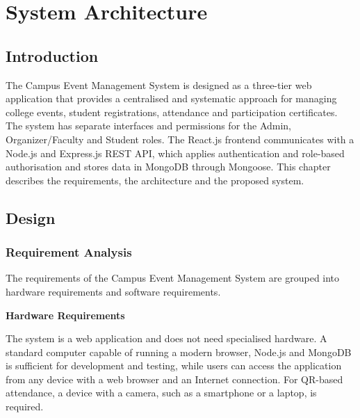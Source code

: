 \documentclass[12pt,a4paper]{report}
\begin{document}
\chapter{System Architecture}

\section{Introduction}
The Campus Event Management System is designed as a three-tier web application that provides a centralised and systematic approach for managing college events, student registrations, attendance and participation certificates. The system has separate interfaces and permissions for the Admin, Organizer/Faculty and Student roles. The React.js frontend communicates with a Node.js and Express.js REST API, which applies authentication and role-based authorisation and stores data in MongoDB through Mongoose. This chapter describes the requirements, the architecture and the proposed system.

\section{Design}

\subsection{Requirement Analysis}
The requirements of the Campus Event Management System are grouped into hardware requirements and software requirements.

\textbf{Hardware Requirements}

The system is a web application and does not need specialised hardware. A standard computer capable of running a modern browser, Node.js and MongoDB is sufficient for development and testing, while users can access the application from any device with a web browser and an Internet connection. For QR-based attendance, a device with a camera, such as a smartphone or a laptop, is required.
\end{document}
